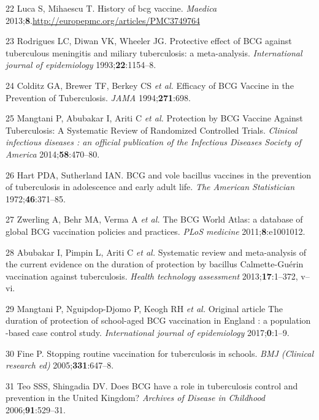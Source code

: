 \documentclass[11pt,twoside]{bristolthesis}
\begin{document}
  \leavevmode\hypertarget{ref-Medicine2013}{}%
  22 Luca S, Mihaescu T. History of bcg vaccine. \emph{Maedica} 2013;\textbf{8}.\url{http://europepmc.org/articles/PMC3749764}
  
  \leavevmode\hypertarget{ref-Rodrigues1993}{}%
  23 Rodrigues LC, Diwan VK, Wheeler JG. Protective effect of BCG against tuberculous meningitis and miliary tuberculosis: a meta-analysis. \emph{International journal of epidemiology} 1993;\textbf{22}:1154--8.
  
  \leavevmode\hypertarget{ref-Colditz1994}{}%
  24 Colditz GA, Brewer TF, Berkey CS \emph{et al.} Efficacy of BCG Vaccine in the Prevention of Tuberculosis. \emph{JAMA} 1994;\textbf{271}:698.
  
  \leavevmode\hypertarget{ref-Mangtani2014a}{}%
  25 Mangtani P, Abubakar I, Ariti C \emph{et al.} Protection by BCG Vaccine Against Tuberculosis: A Systematic Review of Randomized Controlled Trials. \emph{Clinical infectious diseases : an official publication of the Infectious Diseases Society of America} 2014;\textbf{58}:470--80.
  
  \leavevmode\hypertarget{ref-Hart1972}{}%
  26 Hart PDA, Sutherland IAN. BCG and vole bacillus vaccines in the prevention of tuberculosis in adolescence and early adult life. \emph{The American Statistician} 1972;\textbf{46}:371--85.
  
  \leavevmode\hypertarget{ref-Zwerling2011}{}%
  27 Zwerling A, Behr MA, Verma A \emph{et al.} The BCG World Atlas: a database of global BCG vaccination policies and practices. \emph{PLoS medicine} 2011;\textbf{8}:e1001012.
  
  \leavevmode\hypertarget{ref-Abubakar2013}{}%
  28 Abubakar I, Pimpin L, Ariti C \emph{et al.} Systematic review and meta-analysis of the current evidence on the duration of protection by bacillus Calmette-Guérin vaccination against tuberculosis. \emph{Health technology assessment} 2013;\textbf{17}:1--372, v--vi.
  
  \leavevmode\hypertarget{ref-Mangtani2017}{}%
  29 Mangtani P, Nguipdop-Djomo P, Keogh RH \emph{et al.} Original article The duration of protection of school-aged BCG vaccination in England : a population -based case control study. \emph{International journal of epidemiology} 2017;\textbf{0}:1--9.
  
  \leavevmode\hypertarget{ref-Fine2005a}{}%
  30 Fine P. Stopping routine vaccination for tuberculosis in schools. \emph{BMJ (Clinical research ed)} 2005;\textbf{331}:647--8.
  
  \leavevmode\hypertarget{ref-Teo2006}{}%
  31 Teo SSS, Shingadia DV. Does BCG have a role in tuberculosis control and prevention in the United Kingdom? \emph{Archives of Disease in Childhood} 2006;\textbf{91}:529--31.
  
\end{document}
